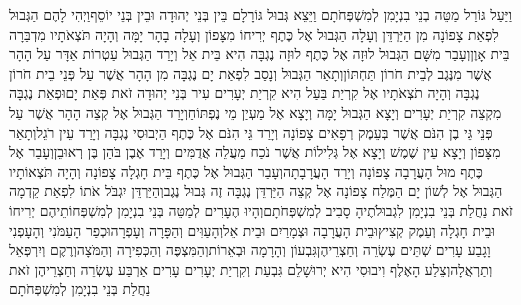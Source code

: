 \documentclass[../main/main.tex]{subfiles}
\begin{document}
\begin{multicols*}{\ncols}
וַיַּעַל גּוֹרַל מַטֵּה בְנֵי בִנְיָמִן לְמִשְׁפְּחֹתָם וַיֵּצֵא גְּבוּל גּוֹרָלָם בֵּין בְּנֵי יְהוּדָה וּבֵין בְּנֵי יוֹסֵף\PreVerseSpace{}וַיְהִי לָהֶם הַגְּבוּל לִפְאַת צָפוֹנָה מִן הַיַּרְדֵּן וְעָלָה הַגְּבוּל אֶל כֶּתֶף יְרִיחוֹ מִצָּפוֹן וְעָלָה בָהָר יָמָּה וְהָיָה תֹּצְאֹתָיו מִדְבַּרָה בֵּית אָוֶן\PreVerseSpace{}וְעָבַר מִשָּׁם הַגְּבוּל לוּזָה אֶל כֶּתֶף לוּזָה נֶגְבָּה הִיא בֵּית אֵל וְיָרַד הַגְּבוּל עַטְרוֹת אַדָּר עַל הָהָר אֲשֶׁר מִנֶּגֶב לְבֵית חֹרוֹן תַּחְתּוֹן\PreVerseSpace{}וְתָאַר הַגְּבוּל וְנָסַב לִפְאַת יָם נֶגְבָּה מִן הָהָר אֲשֶׁר עַל פְּנֵי בֵית חֹרוֹן נֶגְבָּה וְהָיָה תֹצְאֹתָיו אֶל קִרְיַת בַּעַל הִיא קִרְיַת יְעָרִים עִיר בְּנֵי יְהוּדָה זֹאת פְּאַת יָם\PreVerseSpace{}וּפְאַת נֶגְבָּה מִקְצֵה קִרְיַת יְעָרִים וְיָצָא הַגְּבוּל יָמָּה וְיָצָא אֶל מַעְיַן מֵי נֶפְתּוֹחַ\PreVerseSpace{}וְיָרַד הַגְּבוּל אֶל קְצֵה הָהָר אֲשֶׁר עַל פְּנֵי גֵּי בֶן הִנֹּם אֲשֶׁר בְּעֵמֶק רְפָאִים צָפוֹנָה וְיָרַד גֵּי הִנֹּם אֶל כֶּתֶף הַיְבוּסִי נֶגְבָּה וְיָרַד עֵין רֹגֵל\PreVerseSpace{}וְתָאַר מִצָּפוֹן וְיָצָא עֵין שֶׁמֶשׁ וְיָצָא אֶל גְּלִילוֹת אֲשֶׁר נֹכַח מַעֲלֵה אֲדֻמִּים וְיָרַד אֶבֶן בֹּהַן בֶּן רְאוּבֵן\PreVerseSpace{}וְעָבַר אֶל כֶּתֶף מוּל הָעֲרָבָה צָפוֹנָה וְיָרַד הָעֲרָבָתָה\PreVerseSpace{}וְעָבַר הַגְּבוּל אֶל כֶּתֶף בֵּית חָגְלָה צָפוֹנָה וְהָיָה תֹּצְאוֹתָיו הַגְּבוּל אֶל לְשׁוֹן יָם הַמֶּלַח צָפוֹנָה אֶל קְצֵה הַיַּרְדֵּן נֶגְבָּה זֶה גְּבוּל נֶגֶב\PreVerseSpace{}וְהַיַּרְדֵּן יִגְבֹּל אֹתוֹ לִפְאַת קֵדְמָה זֹאת נַחֲלַת בְּנֵי בִנְיָמִן לִגְבוּלֹתֶיהָ סָבִיב לְמִשְׁפְּחֹתָם\PreVerseSpace{}וְהָיוּ הֶעָרִים לְמַטֵּה בְּנֵי בִנְיָמִן לְמִשְׁפְּחוֹתֵיהֶם יְרִיחוֹ וּבֵית חָגְלָה וְעֵמֶק קְצִיץ\PreVerseSpace{}וּבֵית הָעֲרָבָה וּצְמָרַיִם וּבֵית אֵל\PreVerseSpace{}וְהָעַוִּים וְהַפָּרָה וְעָפְרָה\PreVerseSpace{}וּכְפַר הָעַמֹּנִי וְהָעָפְנִי וָגָבַע עָרִים שְׁתֵּים עֶשְׂרֵה וְחַצְרֵיהֶן\PreVerseSpace{}גִּבְעוֹן וְהָרָמָה וּבְאֵרוֹת\PreVerseSpace{}וְהַמִּצְפֶּה וְהַכְּפִירָה וְהַמֹּצָה\PreVerseSpace{}וְרֶקֶם וְיִרְפְּאֵל וְתַרְאֲלָה\PreVerseSpace{}וְצֵלַע הָאֶלֶף וִיבוּסִי\SubEnd{} הִיא יְרוּשָׁלֵם גִּבְעַת וְקִרְיַת יְעָרִים עָרִים\SubEnd{} אַרְבַּע עֶשְׂרֵה וְחַצְרֵיהֶן זֹאת נַחֲלַת בְּנֵי בִנְיָמִן לְמִשְׁפְּחֹתָם\OpenSection{}\par

\end{multicols*}
\end{document}
